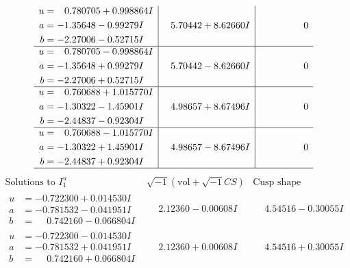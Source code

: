\documentclass[1p]{elsarticle_modified}
\theoremstyle{definition}
\newcommand{\I}{\sqrt{-1}}
\begin{document}
$$\begin{array}{c|c|c}
\begin{aligned}
u &= \phantom{-}0.780705 + 0.998864 I \\
a &= -1.35648 - 0.99279 I \\
b &= -2.27006 - 0.52715 I\end{aligned}
 & \phantom{-}5.70442 + 8.62660 I & \phantom{-0.000000 } 0 \\ \hline\begin{aligned}
u &= \phantom{-}0.780705 - 0.998864 I \\
a &= -1.35648 + 0.99279 I \\
b &= -2.27006 + 0.52715 I\end{aligned}
 & \phantom{-}5.70442 - 8.62660 I & \phantom{-0.000000 } 0 \\ \hline\begin{aligned}
u &= \phantom{-}0.760688 + 1.015770 I \\
a &= -1.30322 - 1.45901 I \\
b &= -2.44837 - 0.92304 I\end{aligned}
 & \phantom{-}4.98657 + 8.67496 I & \phantom{-0.000000 } 0 \\ \hline\begin{aligned}
u &= \phantom{-}0.760688 - 1.015770 I \\
a &= -1.30322 + 1.45901 I \\
b &= -2.44837 + 0.92304 I\end{aligned}
 & \phantom{-}4.98657 - 8.67496 I & \phantom{-0.000000 } 0\\
 \hline 
 \end{array}$$\newpage$$\begin{array}{c|c|c}  
\text{Solutions to }I^u_{1}& \I (\text{vol} + \sqrt{-1}CS) & \text{Cusp shape}\\
 \hline 
\begin{aligned}
u &= -0.722300 + 0.014530 I \\
a &= -0.781532 - 0.041951 I \\
b &= \phantom{-}0.742160 - 0.066804 I\end{aligned}
 & \phantom{-}2.12360 - 0.00608 I & \phantom{-}4.54516 - 0.30055 I \\ \hline\begin{aligned}
u &= -0.722300 - 0.014530 I \\
a &= -0.781532 + 0.041951 I \\
b &= \phantom{-}0.742160 + 0.066804 I\end{aligned}
 & \phantom{-}2.12360 + 0.00608 I & \phantom{-}4.54516 + 0.30055 I \\ \hline\begin{aligned}

\end{aligned}
\end{array}$$
\end{document}
